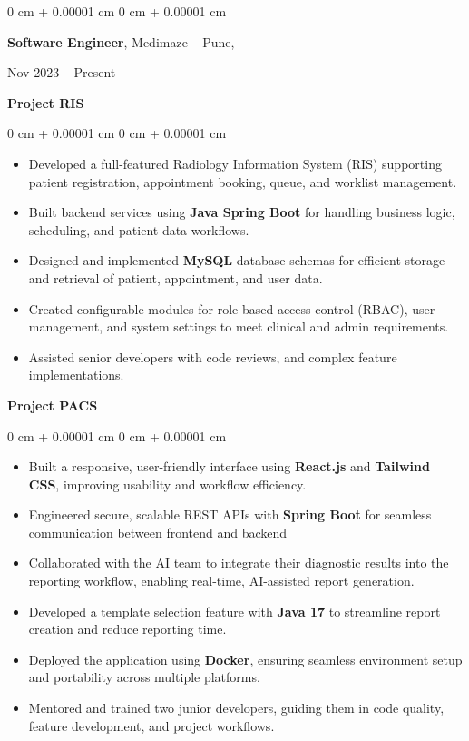 \documentclass[10pt, letterpaper]{article}
\newenvironment{highlights}{
    \begin{itemize}[
        topsep=0.10 cm,
        parsep=0.10 cm,
        partopsep=0pt,
        itemsep=0pt,
        leftmargin=0 cm + 10pt
    ]
}{
    \end{itemize}
} %
\newenvironment{onecolentry}{
    \begin{adjustwidth}{
        0 cm + 0.00001 cm
    }{
        0 cm + 0.00001 cm
    }
}{
    \end{adjustwidth}
} %
\newenvironment{twocolentry}[2][]{
    \onecolentry
    \def\secondColumn{#2}
    \setcolumnwidth{\fill, 4.5 cm}
    \begin{paracol}{2}
}{
    \switchcolumn \raggedleft \secondColumn
    \end{paracol}
    \endonecolentry
} %
\begin{document}
        
        \begin{twocolentry}{
            Nov 2023 – Present
        }
            \textbf{Software Engineer}, Medimaze -- Pune,
            \end{twocolentry}
            \textbf{Project RIS}
            \vspace{0.10 cm}
    \begin{onecolentry}
        \begin{highlights}
            \item Developed a full-featured Radiology Information System (RIS) supporting patient registration, appointment booking, queue, and worklist management.  
            \item Built backend services using \textbf{Java Spring Boot} for handling business logic, scheduling, and patient data workflows.
            \item Designed and implemented \textbf{MySQL} database schemas for efficient storage and retrieval of patient, appointment, and user data.  
            \item Created configurable modules for role-based access control (RBAC), user management, and system settings to meet clinical and admin requirements.
            \item Assisted senior developers with code reviews, and complex feature implementations.
        \end{highlights}
    \end{onecolentry}
    \vspace{0.2 cm}
    
    \textbf{Project PACS}
    \vspace{0.10 cm}
    \begin{onecolentry}
        \begin{highlights}
             \item Built a responsive, user-friendly interface using \textbf{React.js} and \textbf{Tailwind CSS}, improving usability and workflow efficiency.
             \item Engineered secure, scalable REST APIs with \textbf{Spring Boot} for seamless communication between frontend and backend
             \item Collaborated with the AI team to integrate their diagnostic results into the reporting workflow, enabling real-time, AI-assisted report generation.
            \item Developed a template selection feature with \textbf{Java 17} to streamline report creation and reduce reporting time.  
            \item Deployed the application using \textbf{Docker}, ensuring seamless environment setup and portability across multiple platforms.
            \item Mentored and trained two junior developers, guiding them in code quality, feature development, and project workflows.
        \end{highlights}
    \end{onecolentry}
\end{document}

